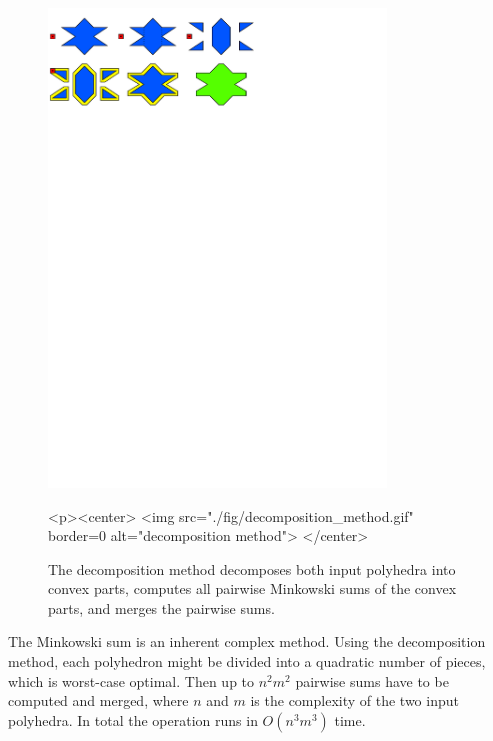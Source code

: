 \begin{figure}[t]
  \begin{ccTexOnly}
    \begin{center}
      \includegraphics[width=0.8\textwidth]{Minkowski_sum_3/fig/decomposition_method}
    \end{center}
  \end{ccTexOnly}
  \begin{ccHtmlOnly}
    <p><center>
    <img src="./fig/decomposition_method.gif" border=0 alt="decomposition method">
    </center>
  \end{ccHtmlOnly}
  \caption{The decomposition method decomposes both input polyhedra
           into convex parts, computes all pairwise Minkowski sums
           of the convex parts, and merges the pairwise sums.}
\end{figure}

The Minkowski sum is an inherent complex method. Using the
decomposition method, each polyhedron might be divided into a
quadratic number of pieces, which is worst-case optimal. Then up to
$n^2m^2$ pairwise sums have to be computed and merged, where $n$ and
$m$ is the complexity of the two input polyhedra. In total the
operation runs in $O(n^3m^3)$ time.

